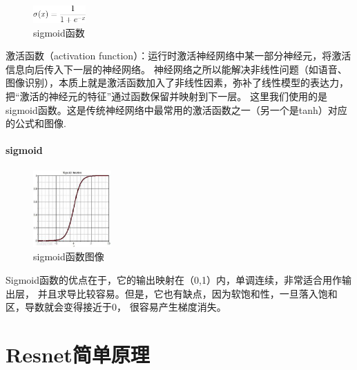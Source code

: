 \begin{figure}[!htbp]
	\centering	\includegraphics[width=2cm]{pic/assets/sigmoidfuc}
    \caption{sigmoid函数}	\label{sigmoid}	\end{figure}

激活函数（activation function）：运行时激活神经网络中某一部分神经元，将激活信息向后传入下一层的神经网络。
神经网络之所以能解决非线性问题（如语音、图像识别），本质上就是激活函数加入了非线性因素，弥补了线性模型的表达力，
把“激活的神经元的特征”通过函数保留并映射到下一层。
这里我们使用的是sigmoid函数。这是传统神经网络中最常用的激活函数之一（另一个是tanh）对应的公式和图像.

\paragraph{sigmoid}

\begin{figure}[!htbp]
    	\centering	\includegraphics[width=3cm]{pic/assets/sigmoidpic}
        \caption{sigmoid函数图像}	\label{sigmoidpic}	\end{figure}
    

Sigmoid函数的优点在于，它的输出映射在（0,1）内，单调连续，非常适合用作输出层，
并且求导比较容易。但是，它也有缺点，因为软饱和性，一旦落入饱和区，导数就会变得接近于0，
很容易产生梯度消失。


\section{Resnet简单原理}

